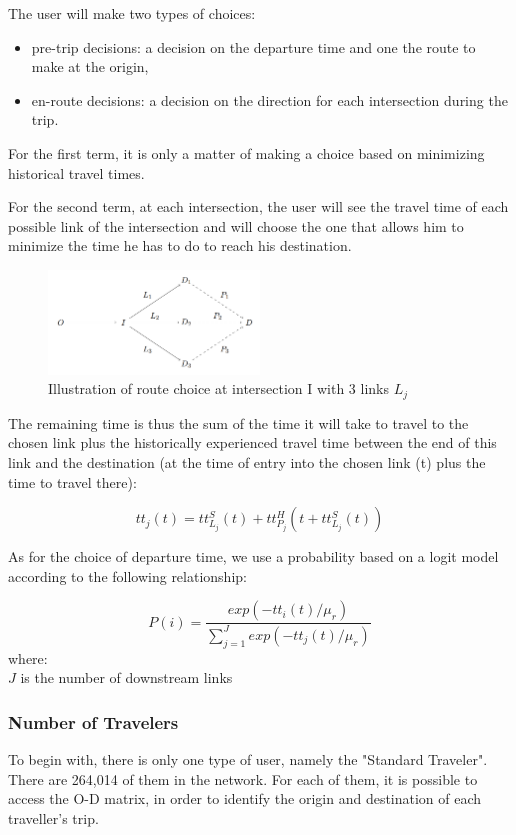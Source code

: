 \documentclass[a4paper, 12pt,oneside]{article}
\begin{document}
The user will make two types of choices:

\begin{itemize}
    \item pre-trip decisions: a decision on the departure time and one the route to make at the origin,
    \item en-route decisions: a decision on the direction for each intersection during the trip.
\end{itemize}

For the first term, it is only a matter of making a choice based on minimizing historical travel times.

For the second term, at each intersection, the user will see the travel time of each possible link of the intersection and will choose the one that allows him to minimize the time he has to do to reach his destination.

\begin{figure}[H]
    \centering
    \includegraphics[width=0.5\textwidth]{Images/capture route choice.png}
    \caption{Illustration of route choice at intersection I with 3 links $L_{j}$}
\end{figure}

The remaining time is thus the sum of the time it will take to travel to the chosen link plus the historically experienced travel time between the end of this link and the destination (at the time of entry into the chosen link (t) plus the time to travel there):

\begin{equation}
    tt_{j}(t)=tt^{S}_{L_{j}}(t) + tt^{H}_{P_{j}}(t+tt^{S}_{L_{j}}(t))
    \end{equation}

As for the choice of departure time, we use a probability based on a logit model according to the following relationship:

\begin{equation}
    P(i)=\frac{exp(-tt_{i}(t)/\mu_{r})}{\sum_{j=1}^{J}exp(-tt_{j}(t)/\mu_{r})}
    \end{equation}
where:\\
$J$ is the number of downstream links
\subsubsection{Number of Travelers}
To begin with, there is only one type of user, namely the "Standard Traveler".  There are 264,014 of them in the network. For each of them, it is possible to access the O-D matrix, in order to identify the origin and destination of each traveller's trip.
\end{document}
